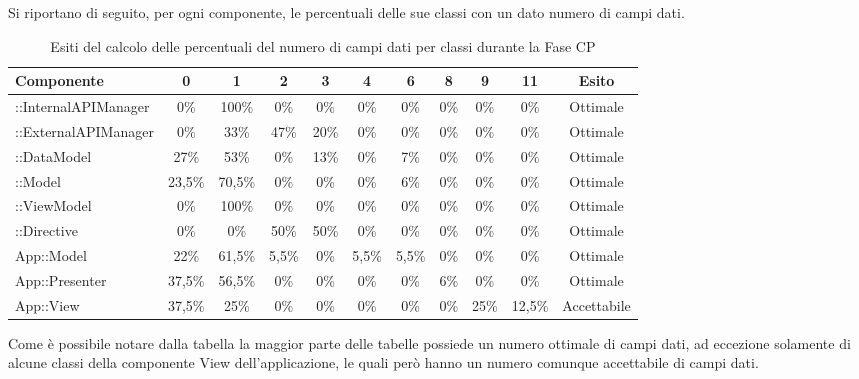 
Si riportano di seguito, per ogni componente, le percentuali delle sue classi con un dato numero di campi dati.
\begin{table}[H]
	\centering
		\begin{tabu}{| l | c | c | c | c | c | c | c | c | c | c | }
			\hline
			Componente	& 0 & 1 & 2 & 3 & 4 & 6 & 8 & 9 & 11 & Esito		\\ \hline \hline
			::InternalAPIManager	& 0\% & 100\% & 0\% & 0\% & 0\% & 0\% & 0\% & 0\% & 0\% & Ottimale  \\ \hline
			::ExternalAPIManager  & 0\% & 33\% & 47\% & 20\% & 0\% & 0\% & 0\% & 0\% & 0\% & Ottimale  \\ \hline
			::DataModel  & 27\% & 53\% & 0\% & 13\% & 0\% & 7\% & 0\% & 0\% & 0\% & Ottimale  \\ \hline
			::Model & 23,5\% & 70,5\% & 0\% & 0\% & 0\% & 6\% & 0\% & 0\% & 0\% & Ottimale  \\ \hline
			::ViewModel & 0\% & 100\% & 0\% & 0\% & 0\% & 0\% & 0\% & 0\% & 0\% & Ottimale  \\ \hline
			::Directive & 0\% & 0\% & 50\% & 50\% & 0\% & 0\% & 0\% & 0\% & 0\% & Ottimale  \\ \hline
			App::Model & 22\% & 61,5\% & 5,5\% & 0\% & 5,5\% & 5,5\% & 0\% & 0\% & 0\% & Ottimale  \\ \hline
			App::Presenter & 37,5\% & 56,5\% & 0\% & 0\% & 0\% & 0\% & 6\% & 0\% & 0\% & Ottimale  \\ \hline
			App::View & 37,5\% & 25\% & 0\% & 0\% & 0\% & 0\% & 0\% & 25\% & 12,5\% & Accettabile  \\ \hline
		\end{tabu}
	\caption{Esiti del calcolo delle percentuali del numero di campi dati per classi durante la Fase CP}
\end{table}
Come è possibile notare dalla tabella la maggior parte delle tabelle possiede un numero ottimale di campi dati, ad eccezione solamente di alcune classi della componente View dell'applicazione, le quali però hanno un numero comunque accettabile di campi dati.
\\ \\


